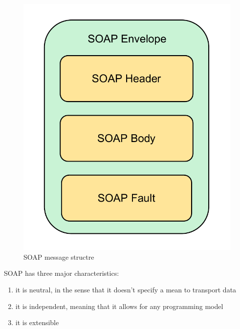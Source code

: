 \begin{figure}[h]
\begin{center}
\includegraphics[scale=0.50]{../Figures/SOAP.pdf}
\end{center}
\caption{SOAP message structre}
\label{figure:soap-message}
\end{figure}



SOAP has three major characteristics:
\begin{enumerate}[1.]
\item it is neutral, in the sense that it doesn't specify a mean to transport data
\item it is independent, meaning that it allows for any programming model
\item it is extensible
\end{enumerate}

